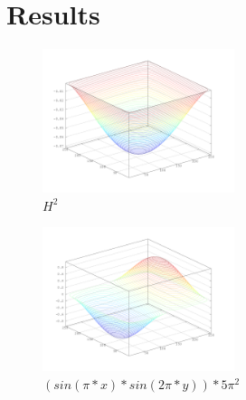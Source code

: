 \section{Results}

\begin{figure}[t]
  \centering
    \includegraphics[width=0.5\textwidth]{datashit512flat_v2.png}
    \caption{$H^2$}
\end{figure}

\begin{figure}[t]
  \centering
    \includegraphics[width=0.5\textwidth]{datashit512sinpixsin2pix_v2.png}
    \caption{$(sin(\pi*x)*sin(2\pi*y))*5\pi^2$}
\end{figure}